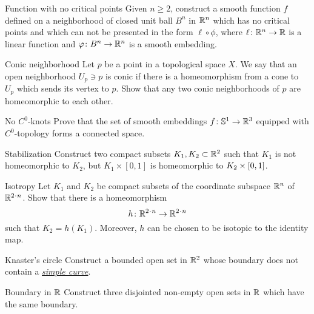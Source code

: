 \documentclass[twoside]{book}
\begin{document}
{\begin{pr}{\many}{Function with no critical points}\label{Function with no critical points}
Given $n\ge 2$, construct a smooth function $f$ defined on a neighborhood of closed unit ball $B^n$ in $\mathbb{R}^n$ which has no critical points and which can not be presented in the form $\ell\circ\phi$, 
where $\ell\colon\mathbb{R}^n\to\mathbb{R}$ is a linear function and $\varphi\colon B^n\to\mathbb{R}^n$ is a smooth embedding.
\end{pr}

\begin{pr}{}{Conic neighborhood}\label{Conic neighborhood}  
Let $p$ be a point in a topological space $X$.
We say that an open neighborhood $U_p\ni p$ is conic
if there is a homeomorphism from a cone
to $U_p$ which sends its vertex to $p$.
Show that any two conic neighborhoods of $p$ are homeomorphic to each other.
\end{pr}

\begin{pr}{}{No $C^0$-knots}\label{No knots}
Prove that the set of smooth embeddings $f\:\mathbb{S}^1\z\to\RR^3$ equipped with $C^0$-topology 
forms a connected space.
\end{pr}

\begin{pr}{}{Stabilization}\label{Simple stabilization}
Construct two compact subsets $K_1, K_2\subset\mathbb{R}^2$ such that
$K_1$ is not homeomorphic to $K_2$, but $K_1\times[0,1]$ is homeomorphic to $K_2\z\times[0,1]$.
\end{pr}

\begin{pr}{}{Isotropy}\label{Isotropy}
Let $K_1$ and $K_2$ be compact subsets of the coordinate subspace $\mathbb{R}^n$ of $\RR^{2\cdot n}$.
Show that there is a homeomorphism 
\[h\:\RR^{2\cdot n}\z\to \RR^{2\cdot n}\] 
such that $K_2=h(K_1)$.
Moreover, $h$ can be chosen to be isotopic to the identity map.
\end{pr}


\begin{pr}{}{Knaster's circle}\label{Knaster's circle} 
Construct a bounded open set in $\mathbb{R}^2$ whose boundary does not contain a 
\hyperref[Simple curve]{\emph{simple curve}}.
\end{pr}


\begin{pr}{\easy}{Boundary in $\mathbb{R}$}\label{Boundary in R}
Construct three disjointed non-empty open sets in $\mathbb{R}$ which have the same boundary.
\end{pr}

}
\end{document}
